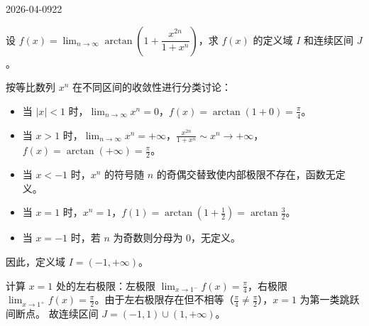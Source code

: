 \begin{mistake}{2026-04-09}{22}

\begin{problemcontent}
设 \( f(x) = \lim_{n \to \infty} \arctan\left(1 + \dfrac{x^{2n}}{1+x^n}\right) \)，求 \( f(x) \) 的定义域 \( I \) 和连续区间 \( J \)。
\end{problemcontent}

\begin{solutioncontent}
按等比数列 \( x^n \) 在不同区间的收敛性进行分类讨论：
\begin{itemize}
 \item 当 \( |x| < 1 \) 时，\( \lim_{n \to \infty} x^n = 0 \)，\( f(x) = \arctan(1 + 0) = \frac{\pi}{4} \)。
 \item 当 \( x > 1 \) 时，\( \lim_{n \to \infty} x^n = +\infty \)，\( \frac{x^{2n}}{1+x^n} \sim x^n \to +\infty \)，\( f(x) = \arctan(+\infty) = \frac{\pi}{2} \)。
 \item 当 \( x < -1 \) 时，\( x^n \) 的符号随 \( n \) 的奇偶交替致使内部极限不存在，函数无定义。
 \item 当 \( x = 1 \) 时，\( x^n = 1 \)，\( f(1) = \arctan\left(1 + \frac{1}{2}\right) = \arctan\frac{3}{2} \)。
 \item 当 \( x = -1 \) 时，若 \( n \) 为奇数则分母为 \( 0 \)，无定义。
\end{itemize}
因此，定义域 \( I = (-1, +\infty) \)。

计算 \( x=1 \) 处的左右极限：左极限 \( \lim_{x \to 1^-} f(x) = \frac{\pi}{4} \)，右极限 \( \lim_{x \to 1^+} f(x) = \frac{\pi}{2} \)。由于左右极限存在但不相等（\( \frac{\pi}{4} \neq \frac{\pi}{2} \)），\( x=1 \) 为第一类跳跃间断点。
故连续区间 \( J = (-1, 1) \cup (1, +\infty) \)。
\end{solutioncontent}


\end{mistake}
